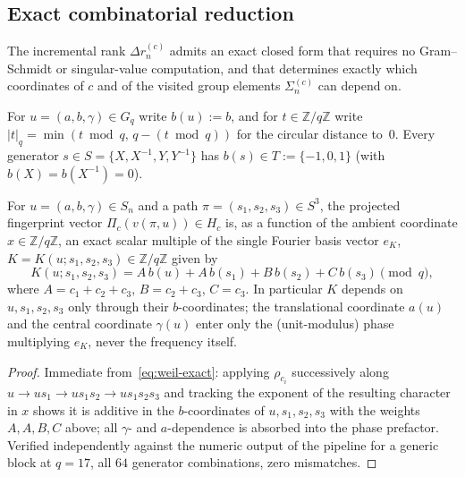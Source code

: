   \subsection{Exact combinatorial reduction}
    \label{sec:alpha-beta}

    The incremental rank $\Delta r_n^{(c)}$ admits an exact closed form that requires no
    Gram--Schmidt or singular-value computation, and that determines exactly which coordinates
    of $c$ and of the visited group elements $\Sigma_n^{(c)}$ can depend on.

    For $u=(a,b,\gamma)\in G_q$ write $b(u):=b$, and for $t\in\mathbb{Z}/q\mathbb{Z}$ write
    $|t|_q=\min(t\bmod q,\,q-(t\bmod q))$ for the circular distance to~$0$.
    Every generator $s\in S=\{X,X^{-1},Y,Y^{-1}\}$ has $b(s)\in T:=\{-1,0,1\}$
    (with $b(X)=b(X^{-1})=0$).

    \begin{proposition}
      \label{prop:frequency}
      For $u=(a,b,\gamma)\in S_n$ and a path $\pi=(s_1,s_2,s_3)\in S^3$, the projected
      fingerprint vector $\Pi_c(v(\pi,u))\in H_c$ is, as a function of the ambient coordinate
      $x\in\mathbb{Z}/q\mathbb{Z}$, an exact scalar multiple of the single Fourier basis vector
      $e_K$, $K=K(u;s_1,s_2,s_3)\in\mathbb{Z}/q\mathbb{Z}$ given by
      \begin{equation}
        K(u;s_1,s_2,s_3) = A\,b(u) + A\,b(s_1) + B\,b(s_2) + C\,b(s_3) \pmod q,
        \label{eq:frequency}
      \end{equation}
      where $A=c_1{+}c_2{+}c_3$, $B=c_2{+}c_3$, $C=c_3$.
      In particular $K$ depends on $u,s_1,s_2,s_3$ only through their $b$-coordinates; the
      translational coordinate $a(u)$ and the central coordinate $\gamma(u)$ enter only the
      (unit-modulus) phase multiplying $e_K$, never the frequency itself.
    \end{proposition}

    \begin{proof}
      Immediate from~\eqref{eq:weil-exact}: applying $\rho_{c_i}$ successively along
      $u\to us_1\to us_1s_2\to us_1s_2s_3$ and tracking the exponent of the resulting
      character in $x$ shows it is additive in the $b$-coordinates of $u,s_1,s_2,s_3$ with the
      weights $A,A,B,C$ above; all $\gamma$- and $a$-dependence is absorbed into the phase
      prefactor. Verified independently against the numeric output of the pipeline for a
      generic block at $q=17$, all $64$ generator combinations, zero mismatches.
    \end{proof}

